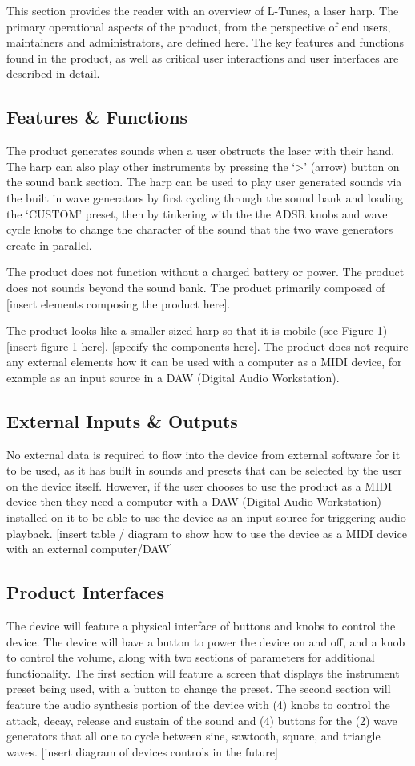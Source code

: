 This section provides the reader with an overview of L-Tunes, a laser harp. The primary operational aspects of the product, from the perspective of end users, maintainers and administrators, are defined here. The key features and functions found in the product, as well as critical user interactions and user interfaces are described in detail.

\subsection{Features \& Functions}
The product generates sounds when a user obstructs the laser with their hand. The harp can also play other instruments by pressing the ‘>’ (arrow) button on the sound bank section. The harp can be used to play user generated sounds via the built in wave generators by first cycling through the sound bank and loading the ‘CUSTOM’ preset, then by tinkering with the the ADSR knobs and wave cycle knobs to change the character of the sound that the two wave generators create in parallel.

The product does not function without a charged battery or power. The product does not sounds beyond the sound bank.
The product primarily composed of [insert elements composing the product here].

The product looks like a smaller sized harp so that it is mobile (see Figure 1) [insert figure 1 here]. [specify the components here]. The product does not require any external elements how it can be used with a computer as a MIDI device, for example as an input source in a DAW (Digital Audio Workstation). 

\subsection{External Inputs \& Outputs}
No external data is required to flow into the device from external software for it to be used, as it has built in sounds and presets that can be selected by the user on the device itself. However, if the user chooses to use the product as a MIDI device then they need a computer with a DAW (Digital Audio Workstation) installed on it to be able to use the device as an input source for triggering audio playback. 
[insert table / diagram to show how to use the device as a MIDI device with an external computer/DAW] 

\subsection{Product Interfaces}
The device will feature a physical interface of buttons and knobs to control the device. The device will have a button to power the device on and off, and a knob to control the volume, along with two sections of parameters for additional functionality. The first section will feature a screen that displays the instrument preset being used, with a button to change the preset. The second section will feature the audio synthesis portion of the device with (4) knobs to control the attack, decay, release and sustain of the sound and (4) buttons for the (2) wave generators that all one to cycle between sine, sawtooth, square, and triangle waves. 
[insert diagram of devices controls in the future] 
